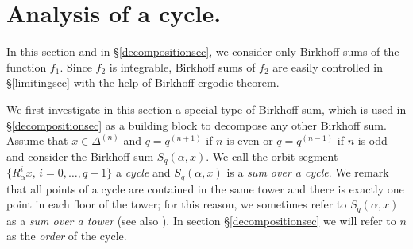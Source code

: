 \documentclass{conm-p-l}
\numberwithin{equation}{section}
\begin{document}
\section{Analysis of a cycle.}\label{cyclesec}

In this section and in \S\ref{decompositionsec}, we consider only Birkhoff sums of the function $f_1$. Since $f_2$ is
integrable, Birkhoff sums of $f_2$ are easily  controlled  in
\S\ref{limitingsec} with the help of Birkhoff ergodic theorem.

We first investigate in this section a special type of Birkhoff sum, which is used in 
\S\ref{decompositionsec} as a building block to decompose any other Birkhoff
sum. Assume that ${x}\in \Delta^{(n)}$ and $q=q^{(n+1)}$ if $n$ is even or
$q=q^{(n-1)}$ if $n$ is odd and consider the Birkhoff sum ${S_{{q}}({\alpha}, {x})}$.
We call the orbit segment $\{ R_{\alpha}^i {x}, \, i=0, \dots, q-1\}$ a
\emph{cycle} and  ${S_{{q}}({\alpha}, {x})}$ is a \emph{sum over a cycle}.
We remark that all points of a cycle are
contained in  the same tower and  there is exactly one point in each floor of the tower; for this
reason, we sometimes refer to ${S_{{q}}({\alpha}, {x})}$ as a \emph{sum over a tower}
(see also \cite{Ul:mix}). In section \S\ref{decompositionsec} we will refer to
$n$ as the \emph{order} of the cycle. 
\end{document}
